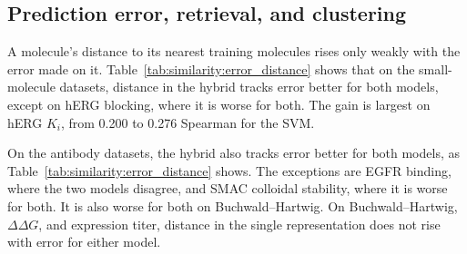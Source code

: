 \subsection{Prediction error, retrieval, and clustering}\label{sec:similarity:results_other}

A molecule's distance to its nearest training molecules rises only weakly with the error made on it. Table~\ref{tab:similarity:error_distance} shows that on the small-molecule datasets, distance in the hybrid tracks error better for both models, except on hERG blocking, where it is worse for both. The gain is largest on hERG $K_i$, from 0.200 to 0.276 Spearman for the SVM.

On the antibody datasets, the hybrid also tracks error better for both models, as Table~\ref{tab:similarity:error_distance} shows. The exceptions are EGFR binding, where the two models disagree, and SMAC colloidal stability, where it is worse for both. It is also worse for both on Buchwald--Hartwig. On Buchwald--Hartwig, $\Delta\Delta G$, and expression titer, distance in the single representation does not rise with error for either model.

